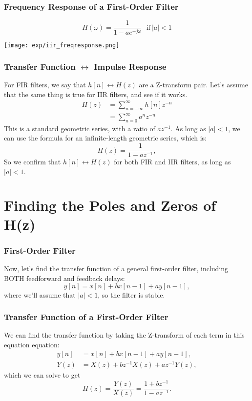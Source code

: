 \documentclass{beamer}
\begin{document}
\begin{frame}
  \frametitle{Frequency Response of a  First-Order Filter}
  \[
  H(\omega) = \frac{1}{1-ae^{-j\omega}}~~~\mbox{if}~|a|<1
  \]
  
  \centerline{\texttt{[image: exp/iir\_freqresponse.png]}}
\end{frame}

\begin{frame}
  \frametitle{Transfer Function $\leftrightarrow$ Impulse Response}

  For FIR filters, we say that $h[n]\leftrightarrow H(z)$ are a
  Z-transform pair.  Let's assume that the same thing is true for IIR
  filters, and see if it works.
  \begin{align*}
    H(z) &= \sum_{n=-\infty}^\infty h[n] z^{-n}\\
    &= \sum_{n=0}^\infty a^n z^{-n} 
  \end{align*}
  This is a standard geometric series, with a ratio of $az^{-1}$.  As
  long as $|a|<1$, we can use the formula for an infinite-length
  geometric series, which is:
  \[
  H(z) = \frac{1}{1-az^{-1}},
  \]
  So we confirm that $h[n]\leftrightarrow H(z)$ for both FIR and IIR
  filters, as long as $|a|<1$.
\end{frame}

\section[Poles and Zeros]{Finding the Poles and Zeros of H(z)}
\setcounter{subsection}{1}

\begin{frame}
  \frametitle{First-Order Filter}

  Now, let's find the transfer function of a general first-order filter, including BOTH
  feedforward and feedback delays:
  \[
  y[n] = x[n] + bx[n-1] + ay[n-1],
  \]
  where we'll assume that $|a|<1$, so the filter is stable.  
\end{frame}

\begin{frame}
  \frametitle{Transfer Function of a First-Order Filter}

  We can find the transfer function by taking the Z-transform of each
  term in this equation equation:
  \begin{align*}
    y[n] &= x[n] + bx[n-1] + ay[n-1],\\
    Y(z) &= X(z)+bz^{-1}X(z)+az^{-1} Y(z),
  \end{align*}
  which we can solve to get
  \[
  H(z)  = \frac{Y(z)}{X(z)} = \frac{1+bz^{-1}}{1-az^{-1}}.
  \]
\end{frame}
\end{document}
